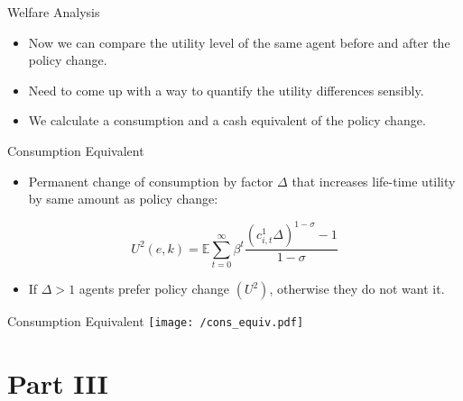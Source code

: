 \documentclass{beamer}
\begin{document}
\begin{frame}{Welfare Analysis}
  \begin{itemize}
  \item {
  Now we can compare the utility level of the same agent before and after the policy change.
  }
  \item {
  Need to come up with a way to quantify the utility differences sensibly.
  }
  \item {
  We calculate a consumption and a cash equivalent of the policy change.
  }
  \end{itemize}
\end{frame}

\begin{frame}{Consumption Equivalent}
  \begin{itemize}

  \item {
  Permanent change of consumption by factor $\Delta$ that increases life-time
  utility by same amount as policy change:
  }
  \end{itemize}
  \begin{equation}
  U^{2}(e,k) = \mathbb{E}\sum_{t=0}^{\infty}\beta^{t}\frac{(c^{1}_{i,t}\Delta)^{1-\sigma}-1}{1-\sigma}\nonumber
  \end{equation}
  \begin{itemize}
  \item {
  If $ \Delta>1 $ agents prefer policy change $ (U^{2}) $, otherwise they do not want it.
  }
  \end{itemize}
\end{frame}

\begin{frame}{Consumption Equivalent}
  \centering \texttt{[image: /cons\_equiv.pdf]}
\end{frame}

\section{Part III}
\subsection{}
\end{document}
